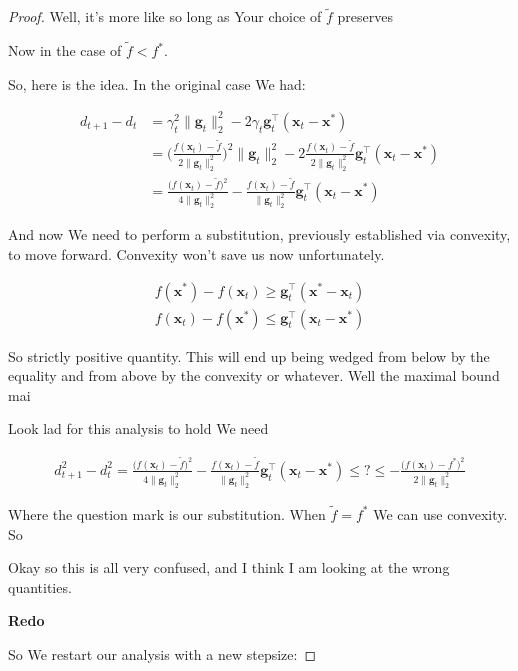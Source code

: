\documentclass{article}
\begin{document}
\begin{proof}
	Well, it's more like so long as Your choice of $\tilde{f}$ preserves 
	
	Now in the case of $\tilde{f} < f^*$.
	
	So, here is the idea. In the original case We had:

	\begin{align}
		d_{t+1} - d_t &= \gamma_t^2 \|\mathbf{g}_t\|^2_2 - 2\gamma_t \mathbf{g}_t^\top(\mathbf{x}_t-\mathbf{x}^*)\\
		&= \bigg(\frac{f(\mathbf{x}_t)-\tilde{f} }{2 \|\mathbf{g}_t\|^2_2} \bigg)^2 \|\mathbf{g}_t\|^2_2 - 2\frac{f(\mathbf{x}_t)-\tilde{f} }{2 \|\mathbf{g}_t\|^2_2} \mathbf{g}_t^\top(\mathbf{x}_t-\mathbf{x}^*)\\
		&= \frac{\big(f(\mathbf{x}_t)-\tilde{f} \big)^2}{4\|\mathbf{g}_t\|^2_2}   - \frac{f(\mathbf{x}_t)-\tilde{f} }{ \|\mathbf{g}_t\|^2_2} \mathbf{g}_t^\top(\mathbf{x}_t-\mathbf{x}^*)
	\end{align}
	
	And now We need to perform a substitution, previously established via convexity, to move forward. Convexity won't save us now unfortunately.
	
	\begin{align}
		f(\mathbf{x}^*) -  f(\mathbf{x}_t) \ge \mathbf{g}_t^\top(\mathbf{x}^*-\mathbf{x}_t)\\
		f(\mathbf{x}_t) - f(\mathbf{x}^*)  \le \mathbf{g}_t^\top(\mathbf{x}_t - \mathbf{x}^*)
	\end{align} 
	
	So strictly positive quantity. This will end up being wedged from below by the equality and from above by the convexity or whatever. Well the maximal bound mai
	
	Look lad for this analysis to hold We need
	
	\begin{align}
		d_{t+1}^2-d_t^2 = \frac{\big(f(\mathbf{x}_t)-\tilde{f} \big)^2}{4\|\mathbf{g}_t\|^2_2}   - \frac{f(\mathbf{x}_t)-\tilde{f} }{ \|\mathbf{g}_t\|^2_2} \mathbf{g}_t^\top(\mathbf{x}_t-\mathbf{x}^*) \le ? \le   -\frac{\big(f(\mathbf{x}_t)-f^*\big)^2}{2\|\mathbf{g}_t\|^2_2}
	\end{align}
	
	Where the question mark is our substitution. When $\tilde{f} = f^*$ We can use convexity. So

	Okay so this is all very confused, and I think I am looking at the wrong quantities. 
	
	\textbf{Redo}
	
	So We restart our analysis with a new stepsize:


\end{proof}
\end{document}
